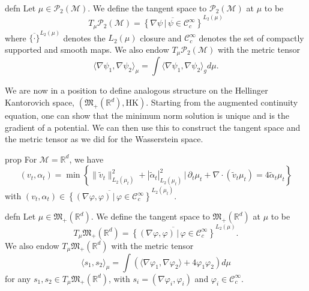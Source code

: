 \documentclass[11pt]{article}
\newcommand{\man}{\mathcal{M}}
\newcommand{\posm}{\mathfrak{M}_+(\mathbb{R}^d)}
\begin{document}
\begin{restatable}{defn}{}
    Let $\mu \in \mathcal{P}_2(\man)$. We define the tangent space to $\mathcal{P}_2(\man)$ at $\mu$ to be 
    \begin{equation}
        T_\mu \mathcal{P}_2(\man) = \overline{\left\{\nabla \psi \, | \, \psi \in \mathcal{C}_c^{\infty}\right\}}^{L_2(\mu)}
    \end{equation}
    where $\overline{\{\cdot \}}^{L_2(\mu)}$ denotes the $L_2(\mu)$ closure and $\mathcal{C}_c^{\infty}$ denotes the set of compactly supported and smooth maps. We also endow $T_\mu \mathcal{P}_2(\man)$ with the metric tensor
    \begin{equation}
        \langle \nabla \psi_1, \nabla \psi_2\rangle_{\mu} = \int \langle\nabla\psi_1, \nabla\psi_2 \rangle_g d\mu. 
    \end{equation}
\end{restatable}
We are now in a position to define analogous structure on the Hellinger Kantorovich space, $(\posm, \text{HK})$. Starting from the augmented continuity equation, one can show that the minimum norm solution is unique and is the gradient of a potential. We can then use this to construct the tangent space and the metric tensor as we did for the Wasserstein space.
\begin{restatable}{prop}{}
    For $\man = \mathbb{R}^d$, we have
    \begin{equation*}
        (v_t, \alpha_t) = \min\left\{\|\tilde v_t\|_{L_2(\mu_t)}^2 + |\tilde \alpha_t|_{L_2(\mu_t)}^2  \, \Big| \, \partial_t\mu_t + \nabla \cdot (\tilde v_t \mu_t) = 4\tilde \alpha_t \mu_t\right\}
    \end{equation*}
    with $(v_t, \alpha_t) \in \overline{\left\{(\nabla \varphi, \varphi) \, | \, \varphi \in \mathcal{C}^{\infty}_{c}\right\}}^{L_2(\mu_t)}$.
\end{restatable}
\begin{restatable}{defn}{}
    Let $\mu \in \posm$. We define the tangent space to $\posm$ at $\mu$ to be 
    \begin{equation}
        T_\mu \posm = \overline{\left\{(\nabla \varphi, \varphi) \, | \, \varphi \in \mathcal{C}_c^{\infty}\right\}}^{L_2(\mu)}.
    \end{equation}
    We also endow $T_\mu \posm$ with the metric tensor
    \begin{equation}
        \langle s_1,  s_2\rangle_{\mu} = \int \left(\langle\nabla\varphi_1, \nabla\varphi_2\rangle + 4\varphi_1\varphi_2 \right) d\mu
    \end{equation}
    for any $s_1, s_2\in T_\mu \posm$, with $s_i = (\nabla \varphi_i, \varphi_i)$ and $\varphi_i \in \mathcal{C}_c^\infty$. 
\end{restatable}
\end{document}
